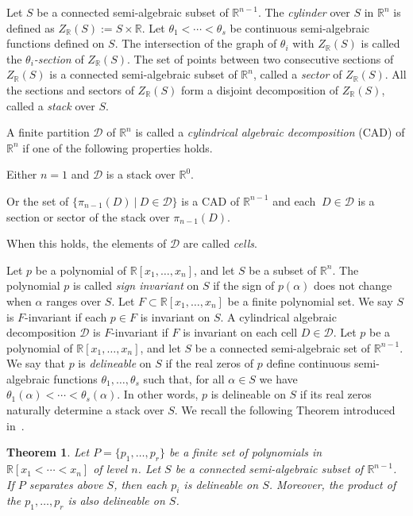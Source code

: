 \documentclass[10pt]{article}
\def\R {\ensuremath{\mathbb{R}}}
\newtheorem{Theorem}{Theorem}
\def\DD {\ensuremath{\mathcal{D}}}
\begin{document}
\smallskip{}
Let $S$ be a connected semi-algebraic subset of $\R^{n-1}$. 
The {\em cylinder} over $S$ in $\R^n$ is defined as $Z_{\R}(S) := S\times\R$.
Let $\theta_1<\cdots<\theta_s$ be continuous semi-algebraic functions 
defined on $S$. The intersection of the graph of $\theta_i$ with $Z_{\R}(S)$
is called the {\em $\theta_i$-section} of $Z_{\R}(S)$.
The set of points between two consecutive sections of $Z_{\R}(S)$
is a connected semi-algebraic subset of $\R^n$, 
called a {\em sector} of $Z_{\R}(S)$.
All the sections and sectors of $Z_{\R}(S)$ form a disjoint 
decomposition of $Z_{\R}(S)$, called a {\em stack} over $S$.

\smallskip{}
A finite partition ${\DD}$ of $\R^n$ is 
called a {\em cylindrical algebraic decomposition} (CAD) of $\R^n$ if 
one of the following properties holds.
\begin{itemizeshort}
\item Either $n=1$ and ${\DD}$ is a stack over $\R^0$.
\item Or the set of $\{ {\pi}_{n-1} (D) \ | \ D \in {\DD} \}$
      is  a CAD of $\R^{n-1}$ and each $\ D \in {\DD}$ is a section 
      or sector of the stack over ${\pi}_{n-1} (D)$.
\end{itemizeshort}  
When this holds, the  elements of ${\DD}$ are called {\em cells}.

\smallskip{}
Let $p$ be a polynomial of $\R[x_1,\ldots,x_n]$, and let $S$ be a subset of $\R^n$.
The polynomial $p$ is  called {\em sign invariant} on  $S$
if the sign of $p(\alpha)$ does not change when $\alpha$ ranges over $S$. 
Let $F\subset\R[x_1,\ldots,x_n]$ be
a finite polynomial set. We say $S$ is $F$-invariant if each $p\in F$ is
invariant on $S$. A cylindrical algebraic decomposition ${\DD}$ is $F$-invariant if 
$F$ is invariant on each cell $D \in {\DD}$.
Let $p$ be a polynomial of $\R[x_1,\ldots,x_n]$, 
and let $S$ be a connected semi-algebraic set of $\R^{n-1}$. We say that $p$ 
is {\em delineable} on $S$ if the real zeros of $p$
define continuous semi-algebraic functions 
$\theta_1,\ldots,\theta_s$ such that, for all $\alpha\in S$ we have 
$\theta_1(\alpha)<\cdots<\theta_s(\alpha)$.
In other words, $p$  is delineable on $S$ if its real zeros
naturally determine a stack over $S$. 
We recall the following Theorem introduced in~\cite{CMXY09}.
\begin{Theorem}
\label{Theorem:stack}
Let $P=\{p_1,\ldots,p_r\}$ be a finite set of polynomials 
in $\R[x_1<\cdots<x_n]$ of level $n$. 
Let $S$ be a connected semi-algebraic subset of $\R^{n-1}$. 
If $P$ {\em separates} above $S$, 
then each $p_i$ is delineable on $S$.
Moreover, the product of the $p_1,\ldots,p_r$ is also delineable on $S$.
\end{Theorem}
\end{document}
